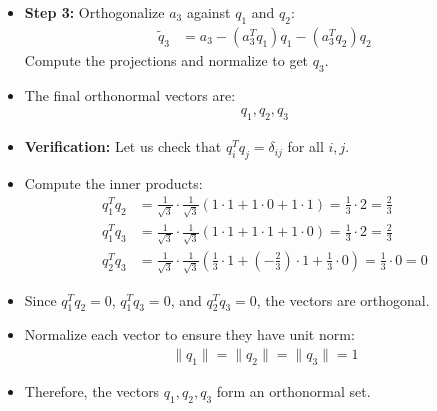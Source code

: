 \begin{frame}
    \begin{itemize}
        \item \textbf{Step 3:} Orthogonalize $a_3$ against $q_1$ and $q_2$:
        \begin{align*}
            \tilde{q}_3 &= a_3 - (a_3^T q_1) q_1 - (a_3^T q_2) q_2
        \end{align*}
        Compute the projections and normalize to get $q_3$.
        
        \item The final orthonormal vectors are:
        \begin{align*}
            q_1, q_2, q_3
        \end{align*}
        
        \item \textbf{Verification:} Let us check that $q_i^T q_j = \delta_{ij}$ for all $i, j$.
    \end{itemize}
\end{frame}

\begin{frame}
    \begin{itemize}
        \item Compute the inner products:
        \begin{align*}
            q_1^T q_2 &= \frac{1}{\sqrt{3}} \cdot \frac{1}{\sqrt{3}} \left(1 \cdot 1 + 1 \cdot 0 + 1 \cdot 1\right) = \frac{1}{3} \cdot 2 = \frac{2}{3} \\
            q_1^T q_3 &= \frac{1}{\sqrt{3}} \cdot \frac{1}{\sqrt{3}} \left(1 \cdot 1 + 1 \cdot 1 + 1 \cdot 0\right) = \frac{1}{3} \cdot 2 = \frac{2}{3} \\
            q_2^T q_3 &= \frac{1}{\sqrt{3}} \cdot \frac{1}{\sqrt{3}} \left(\frac{1}{3} \cdot 1 + \left(-\frac{2}{3}\right) \cdot 1 + \frac{1}{3} \cdot 0\right) = \frac{1}{3} \cdot 0 = 0
        \end{align*}
        \item Since $q_1^T q_2 = 0$, $q_1^T q_3 = 0$, and $q_2^T q_3 = 0$, the vectors are orthogonal.
        \item Normalize each vector to ensure they have unit norm:
        \begin{align*}
            \|q_1\| = \|q_2\| = \|q_3\| = 1
        \end{align*}
        \item Therefore, the vectors $q_1, q_2, q_3$ form an orthonormal set.
    \end{itemize}
\end{frame}



